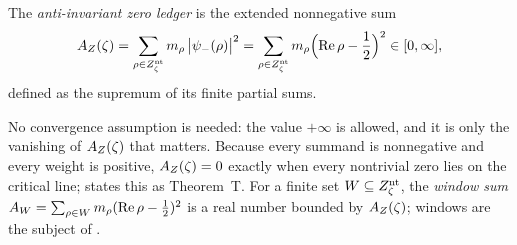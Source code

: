 \begin{definition}
\label{def:rh:anti-invariant-zero-ledger}
The \emph{anti-invariant zero ledger} is the extended nonnegative sum
\[
  A_{Z}(\zeta)=\sum_{\rho\in Z_{\zeta}^{\mathrm{nt}}}m_\rho\,\bigl|\psi_{-}(\rho)\bigr|^2
     =\sum_{\rho\in Z_{\zeta}^{\mathrm{nt}}}m_\rho\Bigl(\operatorname{Re}\rho-\frac12\Bigr)^2
  \in[0,\infty],
\]
defined as the supremum of its finite partial sums.
\end{definition}

No convergence assumption is needed: the value \(+\infty\) is allowed,
and it is only the vanishing of \(A_{Z}(\zeta)\) that matters.  Because every
summand is nonnegative and every weight is positive, \(A_{Z}(\zeta)=0\) exactly
when every nontrivial zero lies on the critical line;
 states this as Theorem~T.  For a finite
set \(W\subseteq Z_{\zeta}^{\mathrm{nt}}\), the \emph{window sum}
\(A_W=\sum_{\rho\in W}m_\rho(\operatorname{Re}\rho-\frac12)^2\) is a real number
bounded by \(A_{Z}(\zeta)\); windows are the subject of
.
